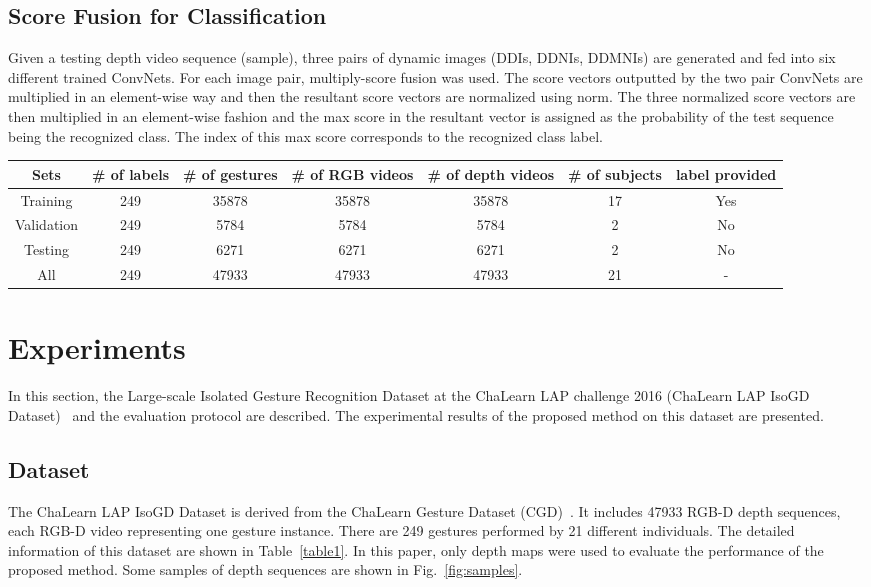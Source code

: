 \documentclass[10pt, a4paper, conference]{IEEEtran}
\begin{document}
\subsection{Score Fusion for Classification}

Given a testing depth video sequence (sample), three pairs of dynamic images (DDIs, DDNIs, DDMNIs) are generated and fed into six different trained ConvNets. For each image pair, multiply-score fusion was used. The score vectors outputted by the two pair ConvNets are multiplied in an element-wise  way and then the resultant score vectors are normalized using  norm. The three normalized score vectors are then multiplied in an element-wise fashion and the max score in the resultant vector is assigned as the probability of the test sequence being the recognized class. The index of this max score corresponds to the recognized class label.

\begin{table*}[!ht]
\centering
\caption{Information of the ChaLearn LAP IsoGD Dataset. \label{table1}}
\begin{tabular}{|c|c|c|c|c|c|c|}
\hline
Sets &\# of labels &\# of gestures & \# of RGB videos & \# of depth videos & \# of subjects & label provided \\
\hline
Training & 249 & 35878 & 35878 & 35878 & 17 & Yes \\
\hline
Validation & 249 & 5784 & 5784 & 5784 & 2 & No \\
\hline
Testing & 249 &  6271 & 6271 & 6271 & 2 & No \\
\hline
All & 249 & 47933 & 47933 & 47933 & 21 & - \\
\hline
\end{tabular}
\end{table*}

\section{Experiments}
In this section, the Large-scale Isolated Gesture Recognition Dataset at the ChaLearn LAP challenge 2016 (ChaLearn LAP IsoGD Dataset)~\cite{ICPRW2016} and the evaluation protocol are described. The experimental results of the proposed method on this dataset are presented.

\subsection{Dataset}
The ChaLearn LAP IsoGD Dataset is derived from the ChaLearn Gesture Dataset (CGD)~\cite{guyon2014chalearn}. It includes 47933 RGB-D depth sequences, each RGB-D video representing one gesture instance. There are 249 gestures performed by 21 different individuals.  The detailed information of this dataset are shown in Table~\ref{table1}.  In this paper, only depth maps were used to evaluate the performance of the proposed method. Some samples of depth sequences are shown in Fig.~\ref{fig:samples}.
\end{document}

